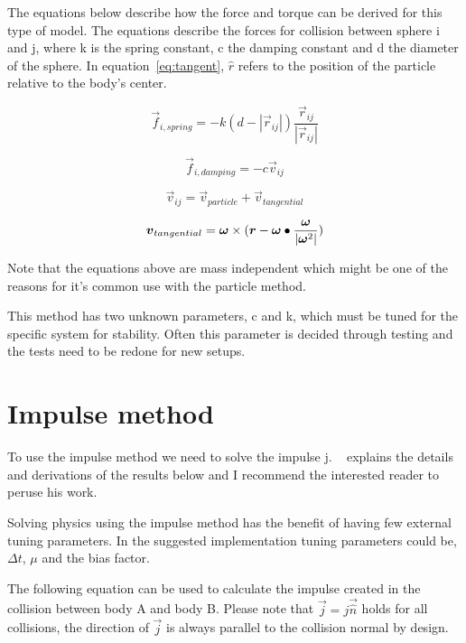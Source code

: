The equations below describe how the force and torque can be derived for this type
of model. The equations describe the forces for collision between sphere i and j,
where k is the spring constant, c the damping constant and d the
diameter of the sphere. In equation~\ref{eq:tangent}, $\hat{r}$ refers to the
position of the particle relative to the body's center.

\begin{equation}
  \vec{f}_{i,spring} = -k(d-|\vec{r}_{ij}|)\frac{\vec{r}_{ij}}{|\vec{r}_{ij}|}
\end{equation}

\begin{equation}
  \vec{f}_{i,damping} = -c\vec{v}_{ij}
\end{equation}

\begin{equation}
  \vec{v}_{ij} = \vec{v}_{particle} + \vec{v}_{tangential}
\end{equation}

\begin{equation}\label{eq:tangent}
  \boldsymbol{v}_{tangential} = \boldsymbol{\omega} \times ( \boldsymbol{r}- \boldsymbol{\omega}\bullet\frac{\boldsymbol{\omega}}{|\boldsymbol{\omega}^2|})
\end{equation}

Note that the equations above are mass independent which might be one of the
reasons for it's common use with the particle method.

This method has two unknown parameters, c and k, which must be tuned for the
specific system for stability. Often this parameter is decided through testing
and the tests need to be redone for new setups.

\section{Impulse method}\label{sec:imp}
To use the impulse method we need to solve the impulse j. ~\cite{baraff} explains the details
and derivations of the results below and I recommend the interested reader to peruse
his work.

Solving physics using the impulse method has the benefit of having few external tuning
parameters. In the suggested implementation tuning parameters could be, $\Delta t$,
$\mu$ and the bias factor.

The following equation can be used to calculate the impulse created in the
collision between body A and body B.
Please note that $\vec{j} = j\vec{\hat{n}}$ holds for all collisions, the direction
of $\vec{j}$ is always parallel to the collision normal by design.

